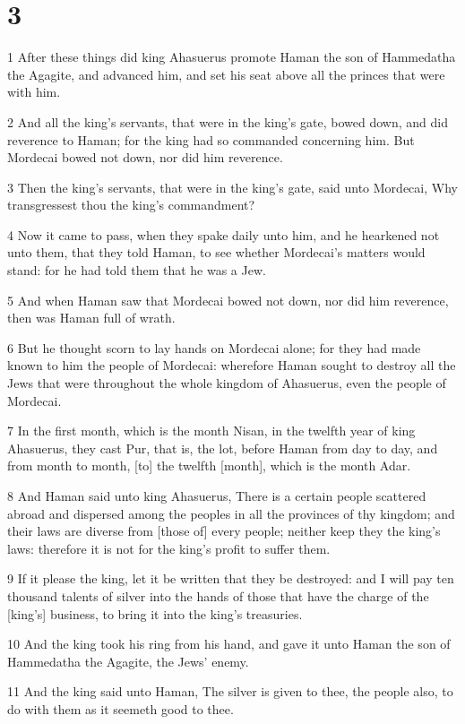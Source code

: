 \chapter{3}

\par 1 After these things did king Ahasuerus promote Haman the son of Hammedatha the Agagite, and advanced him, and set his seat above all the princes that were with him.
\par 2 And all the king's servants, that were in the king's gate, bowed down, and did reverence to Haman; for the king had so commanded concerning him. But Mordecai bowed not down, nor did him reverence.
\par 3 Then the king's servants, that were in the king's gate, said unto Mordecai, Why transgressest thou the king's commandment?
\par 4 Now it came to pass, when they spake daily unto him, and he hearkened not unto them, that they told Haman, to see whether Mordecai's matters would stand: for he had told them that he was a Jew.
\par 5 And when Haman saw that Mordecai bowed not down, nor did him reverence, then was Haman full of wrath.
\par 6 But he thought scorn to lay hands on Mordecai alone; for they had made known to him the people of Mordecai: wherefore Haman sought to destroy all the Jews that were throughout the whole kingdom of Ahasuerus, even the people of Mordecai.
\par 7 In the first month, which is the month Nisan, in the twelfth year of king Ahasuerus, they cast Pur, that is, the lot, before Haman from day to day, and from month to month, [to] the twelfth [month], which is the month Adar.
\par 8 And Haman said unto king Ahasuerus, There is a certain people scattered abroad and dispersed among the peoples in all the provinces of thy kingdom; and their laws are diverse from [those of] every people; neither keep they the king's laws: therefore it is not for the king's profit to suffer them.
\par 9 If it please the king, let it be written that they be destroyed: and I will pay ten thousand talents of silver into the hands of those that have the charge of the [king's] business, to bring it into the king's treasuries.
\par 10 And the king took his ring from his hand, and gave it unto Haman the son of Hammedatha the Agagite, the Jews' enemy.
\par 11 And the king said unto Haman, The silver is given to thee, the people also, to do with them as it seemeth good to thee.
